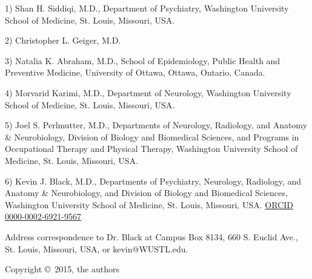 1) Shan H. Siddiqi, M.D., Department of Psychiatry, Washington University School of Medicine, St. Louis, Missouri, USA.

2) Christopher L. Geiger, M.D. 

3) Natalia K. Abraham, M.D., School of Epidemiology, Public Health and Preventive Medicine, University of Ottawa, Ottawa, Ontario, Canada.

4) Morvarid Karimi, M.D., Department of Neurology, Washington University School of Medicine, St. Louis, Missouri, USA.

5) Joel S. Perlmutter, M.D., Departments of Neurology, Radiology, and Anatomy & Neurobiology, Division of Biology and Biomedical Sciences, and Programs in Occupational Therapy and Physical Therapy, Washington University School of Medicine, St. Louis, Missouri, USA.

6) Kevin J. Black, M.D., Departments of Psychiatry, Neurology, Radiology, and Anatomy \& Neurobiology, and Division of Biology and Biomedical Sciences, Washington University School of Medicine, St. Louis, Missouri, USA.  \href{http://orcid.org/0000-0002-6921-9567}{ORCID 0000-0002-6921-9567}

Address correspondence to Dr. Black at Campus Box 8134, 660 S. Euclid Ave., St. Louis, Missouri, USA, or kevin@WUSTL.edu.

Copyright \copyright\, 2015, the authors